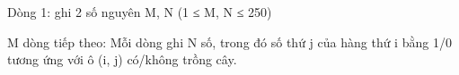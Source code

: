 Dòng 1: ghi 2 số nguyên M, N (1 ≤ M, N ≤ 250)  

   M dòng tiếp theo: Mỗi dòng ghi N số, trong đó số thứ j của hàng thứ i bằng 1/0 tương ứng với ô (i, j) có/không trồng cây.